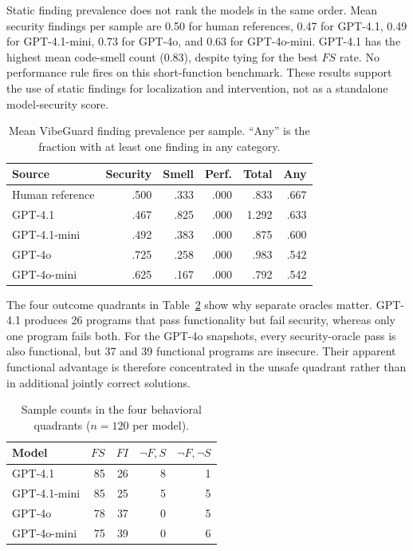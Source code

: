 \documentclass[sigconf,nonacm]{acmart}
\begin{document}
Static finding prevalence does not rank the models in the same order. Mean
security findings per sample are 0.50 for human references, 0.47 for GPT-4.1,
0.49 for GPT-4.1-mini, 0.73 for GPT-4o, and 0.63 for GPT-4o-mini. GPT-4.1 has
the highest mean code-smell count (0.83), despite tying for the best $FS$ rate.
No performance rule fires on this short-function benchmark. These results
support the use of static findings for localization and intervention, not as a
standalone model-security score.

\begin{table}[t]
\caption{Mean VibeGuard finding prevalence per sample. ``Any'' is the fraction
with at least one finding in any category.}
\label{tab:prevalence}
\centering
\small
\begin{tabular}{lrrrrr}
\toprule
Source & Security & Smell & Perf. & Total & Any \\
\midrule
Human reference & .500 & .333 & .000 & .833 & .667 \\
GPT-4.1 & .467 & .825 & .000 & 1.292 & .633 \\
GPT-4.1-mini & .492 & .383 & .000 & .875 & .600 \\
GPT-4o & .725 & .258 & .000 & .983 & .542 \\
GPT-4o-mini & .625 & .167 & .000 & .792 & .542 \\
\bottomrule
\end{tabular}
\end{table}

The four outcome quadrants in Table~\ref{tab:quadrants} show why separate
oracles matter. GPT-4.1 produces 26 programs that pass functionality but fail
security, whereas only one program fails both. For the GPT-4o snapshots, every
security-oracle pass is also functional, but 37 and 39 functional programs are
insecure. Their apparent functional advantage is therefore concentrated in the
unsafe quadrant rather than in additional jointly correct solutions.

\begin{table}[t]
\caption{Sample counts in the four behavioral quadrants ($n=120$ per model).}
\label{tab:quadrants}
\centering
\small
\begin{tabular}{lrrrr}
\toprule
Model & $FS$ & $FI$ & $\neg F,S$ & $\neg F,\neg S$ \\
\midrule
GPT-4.1 & 85 & 26 & 8 & 1 \\
GPT-4.1-mini & 85 & 25 & 5 & 5 \\
GPT-4o & 78 & 37 & 0 & 5 \\
GPT-4o-mini & 75 & 39 & 0 & 6 \\
\bottomrule
\end{tabular}
\end{table}
\end{document}
